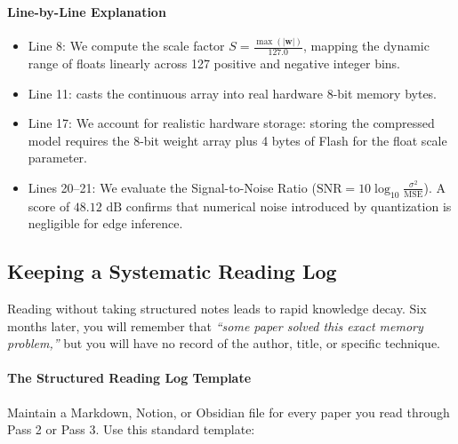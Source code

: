 \paragraph{Line-by-Line Explanation}
\begin{itemize}
    \item Line 8: We compute the scale factor $S = \frac{\max(|\mathbf{w}|)}{127.0}$, mapping the dynamic range of floats linearly across 127 positive and negative integer bins.
    \item Line 11:  casts the continuous array into real hardware 8-bit memory bytes.
    \item Line 17: We account for realistic hardware storage: storing the compressed model requires the 8-bit weight array plus 4 bytes of Flash for the float scale parameter.
    \item Lines 20--21: We evaluate the Signal-to-Noise Ratio ($\text{SNR} = 10 \log_{10} \frac{\sigma^2}{\text{MSE}}$). A score of $48.12\text{ dB}$ confirms that numerical noise introduced by quantization is negligible for edge inference.
\end{itemize}

\subsection{Keeping a Systematic Reading Log}

Reading without taking structured notes leads to rapid knowledge decay. Six months later, you will remember that \textit{``some paper solved this exact memory problem,''} but you will have no record of the author, title, or specific technique.

\paragraph{The Structured Reading Log Template}
Maintain a Markdown, Notion, or Obsidian file for every paper you read through Pass 2 or Pass 3. Use this standard template:

